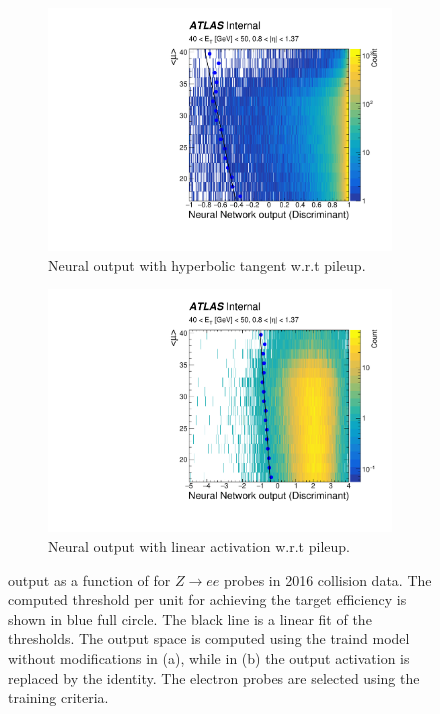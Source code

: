 \begin{figure}[h!tb]
  \begin{center}
  \begin{subfigure}[c]{.48\textwidth}
  \centering
  \includegraphics[width=\textwidth]{sections/tuning_strategy/figures/hist2D_signal_pileupCorrection_with_tansig_et3_eta1.pdf}
  \caption{Neural output with hyperbolic tangent w.r.t pileup.}
  \label{fig:nn_correction_with_tansig}
  \end{subfigure}
  \hfill
  \begin{subfigure}[c]{.48\textwidth}
  \centering
  \includegraphics[width=\textwidth]{sections/tuning_strategy/figures/hist2D_signal_pileupCorrection_without_tansig_et3_eta1.pdf}
  \caption{Neural output with linear activation w.r.t pileup.}
  \label{fig:nn_correction_without_tansig}
  \end{subfigure}
  \caption{
    \rnn output as a function of \avgmu{} for $Z\rightarrow ee$ probes in 
    2016 collision data.
    The computed threshold per \avgmu{} unit for achieving the target 
    efficiency is shown in blue full circle. The black line is a linear fit of the thresholds.
    The output space is computed using the traind model without modifications 
    in (a), while in (b) the output activation is replaced by the identity.
    The electron probes are selected using the training criteria.
  }%
  \end{center}
  \end{figure}
